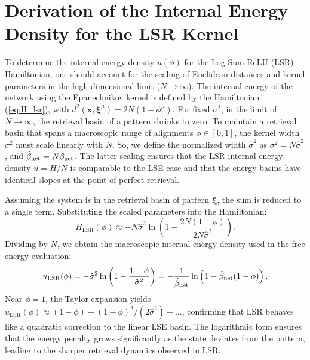 \documentclass{article}
\theoremstyle{plain}
\theoremstyle{definition}
\theoremstyle{remark}
\begin{document}
\section{Derivation of the Internal Energy Density for the LSR Kernel}

To determine the internal energy density $u(\phi)$ for the Log-Sum-ReLU (LSR) Hamiltonian, one should account for the scaling of Euclidean distances and kernel parameters in the high-dimensional limit ($N \to \infty$). The internal energy of the network using the Epanechnikov kernel is defined by the Hamiltonian (\ref{eq:H_lsr}), with $d^2(\mathbf{x}, \boldsymbol{\xi}^\mu) = 2N(1 - \phi^\mu)$. 
For fixed $\sigma^2$, in the limit of $N \to \infty$, the retrieval basin of a pattern shrinks to zero. To maintain a retrieval basin that spans a macroscopic range of alignments $\phi \in [0, 1]$, the kernel width $\sigma^2$ must scale linearly with $N$. So, we define the normalized width $\hat{\sigma}^2$ as $\sigma^2 = N \hat{\sigma}^2$, and $\hat\beta_{\rm net} = N \beta_{\rm net}$. The latter scaling ensures  that the LSR internal energy density $u = H/N$ is comparable to the LSE case and that the energy basins have identical slopes at the point of perfect retrieval.

Assuming the system is in the retrieval basin of pattern $\bm{\xi}$, the sum is reduced to a single term. Substituting the scaled parameters into the Hamiltonian:
\begin{equation}
H_{\text{LSR}}(\phi) \approx -N \hat{\sigma}^2 \ln \left( 1 - \frac{2N(1-\phi)}{2N\hat{\sigma}^2} \right).
\end{equation}
Dividing by $N$, we obtain the macroscopic internal energy density used in the free energy evaluation:
\begin{equation}
u_{\text{LSR}}(\phi) = -\hat{\sigma}^2 \ln \left( 1 - \frac{1-\phi}{\hat{\sigma}^2} \right) = -\frac{1}{\hat\beta_{\rm net}} \ln \left( 1 - \hat\beta_{\rm net}(1-\phi) \right).
\end{equation}
Near $\phi=1$, the Taylor expansion yields $u_{\text{LSR}}(\phi) \approx (1-\phi) + (1-\phi)^2 /(2\hat{\sigma}^2) + \dots$, confirming that LSR behaves like a quadratic correction to the linear LSE basin. The logarithmic form ensures that the energy penalty grows significantly as the state deviates from the pattern, leading to the sharper retrieval dynamics observed in LSR.

\end{document}
